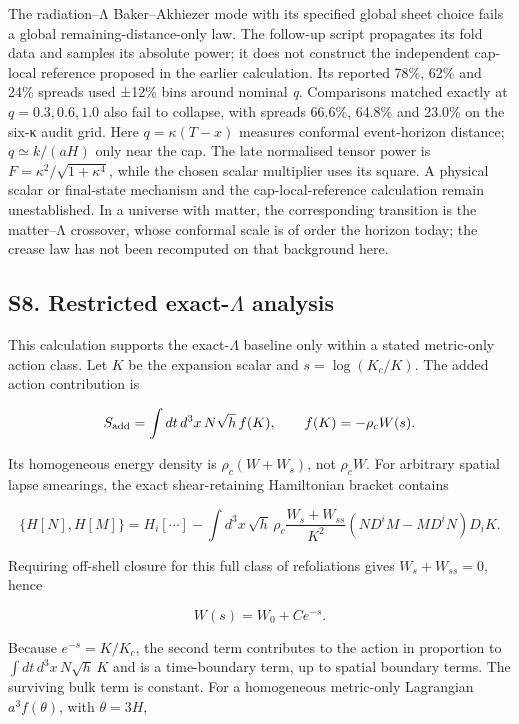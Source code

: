 \documentclass[
]{article}
\begin{document}
The radiation--Λ Baker--Akhiezer mode with its specified global sheet
choice fails a global remaining-distance-only law. The follow-up script
propagates its fold data and samples its absolute power; it does not
construct the independent cap-local reference proposed in the earlier
calculation. Its reported 78\%, 62\% and 24\% spreads used ±12\% bins
around nominal \emph{q}. Comparisons matched exactly at
\(q=0.3,0.6,1.0\) also fail to collapse, with spreads 66.6\%, 64.8\% and
23.0\% on the six-κ audit grid. Here \(q=\kappa(T-x)\) measures
conformal event-horizon distance; \(q\simeq k/(aH)\) only near the cap.
The late normalised tensor power is \(F=\kappa^2/\sqrt{1+\kappa^4}\),
while the chosen scalar multiplier uses its square. A physical scalar or
final-state mechanism and the cap-local-reference calculation remain
unestablished. In a universe with matter, the corresponding transition
is the matter--Λ crossover, whose conformal scale is of order the
horizon today; the crease law has not been recomputed on that background
here.

\subsection{\texorpdfstring{S8. Restricted exact-\(\Lambda\)
analysis}{S8. Restricted exact-\textbackslash Lambda analysis}}\label{s8.-restricted-exact-lambda-analysis}

This calculation supports the exact-\(\Lambda\) baseline only within a
stated metric-only action class. Let \(K\) be the expansion scalar and
\(s=\log(K_c/K)\). The added action contribution is

\[
S_{\rm add}=\int dt\,d^3x\,N\sqrt h\,f(K),
\qquad f(K)=-\rho_c W(s).
\]

Its homogeneous energy density is \(\rho_c(W+W_s)\), not \(\rho_cW\).
For arbitrary spatial lapse smearings, the exact shear-retaining
Hamiltonian bracket contains

\[
\{H[N],H[M]\}=H_i[\cdots]
-\int d^3x\,\sqrt h\,\rho_c
\frac{W_s+W_{ss}}{K^2}
(N D^iM-MD^iN)D_iK .
\]

Requiring off-shell closure for this full class of refoliations gives
\(W_s+W_{ss}=0\), hence

\[
W(s)=W_0+C e^{-s}.
\]

Because \(e^{-s}=K/K_c\), the second term contributes to the action in
proportion to \(\int dt\,d^3x\,N\sqrt h\,K\) and is a time-boundary
term, up to spatial boundary terms. The surviving bulk term is constant.
For a homogeneous metric-only Lagrangian \(a^3f(\theta)\), with
\(\theta=3H\),
\end{document}
